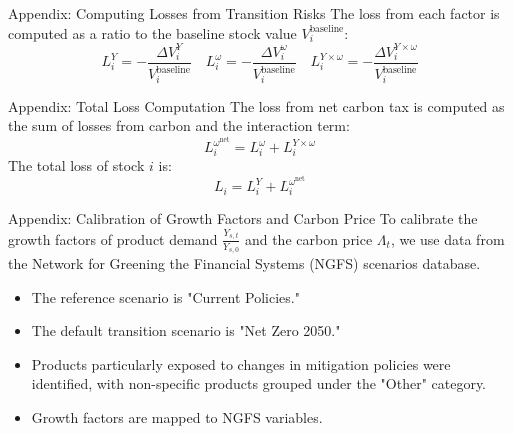 \documentclass{beamer}
\begin{document}
\begin{frame}{Appendix: Computing Losses from Transition Risks}
  The loss from each factor is computed as a ratio to the baseline stock value $V_i^\text{baseline}$:
  \begin{equation}
    L_i^Y = -\frac{\Delta V_i^Y}{V_i^\text{baseline}} \quad L_i^\omega = -\frac{\Delta V_i^\omega}{V_i^\text{baseline}} \quad L_i^{Y \times \omega} = -\frac{\Delta V_i^{Y \times \omega}}{V_i^\text{baseline}}
  \end{equation}
\end{frame}

\begin{frame}{Appendix: Total Loss Computation}
  The loss from net carbon tax is computed as the sum of losses from carbon and the interaction term:
  \begin{equation}
    L_i^{\omega^\text{net}} = L_i^\omega + L_i^{Y \times \omega}
  \end{equation}
  The total loss of stock $i$ is:
  \begin{equation}
    L_i = L_i^Y + L_i^{\omega^\text{net}}
  \end{equation}
\end{frame}


\begin{frame}{Appendix: Calibration of Growth Factors and Carbon Price}
  To calibrate the growth factors of product demand $ \frac{Y_{s,t}}{Y_{s,0}} $ and the carbon price $ \Lambda_t $, we use data from the
  Network for Greening the Financial Systems (NGFS)
  scenarios database.
  \begin{itemize}
    \item The reference scenario is "Current Policies."
    \item The default transition scenario is "Net Zero 2050."
    \item Products particularly exposed to changes in mitigation policies
          were identified, with non-specific products
          grouped under the "Other" category.
    \item Growth factors are mapped to NGFS variables.
  \end{itemize}
\end{frame}
\end{document}
